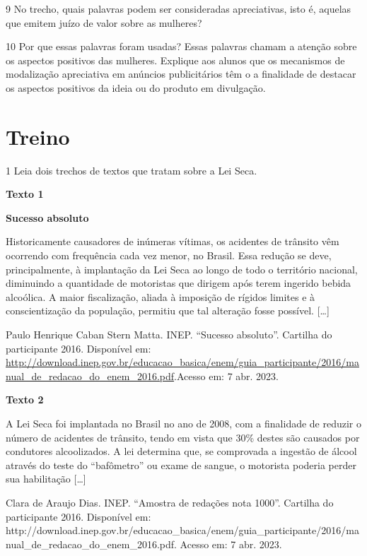 \begin{itemize}
\begin{itemize}
\num{9} No trecho, quais palavras podem ser consideradas apreciativas,
isto é, aquelas que emitem juízo de valor sobre as mulheres? 

\num{10} Por que essas palavras foram usadas?  Essas palavras
chamam a atenção sobre os aspectos positivos das mulheres. Explique aos
alunos que os mecanismos de modalização apreciativa em anúncios
publicitários têm o a finalidade de destacar os aspectos positivos da
ideia ou do produto em divulgação.

\section{Treino}

\num{1} Leia dois trechos de textos que tratam sobre a Lei Seca.

\textbf{Texto 1}

\textbf{Sucesso absoluto}

Historicamente causadores de inúmeras vítimas, os acidentes de trânsito
vêm ocorrendo com frequência cada vez menor, no Brasil. Essa redução se
deve, principalmente, à implantação da Lei Seca ao longo de todo o
território nacional, diminuindo a quantidade de motoristas que dirigem
após terem ingerido bebida alcoólica. A maior fiscalização, aliada à
imposição de rígidos limites e à conscientização da população, permitiu
que tal alteração fosse possível. {[}\ldots{}{]}

Paulo Henrique Caban Stern Matta. INEP. ``Sucesso absoluto''. Cartilha
do participante 2016. Disponível em:
\url{http://download.inep.gov.br/educacao_basica/enem/guia_participante/2016/manual_de_redacao_do_enem_2016.pdf}.Acesso
em: 7 abr. 2023.

\textbf{Texto 2}

A Lei Seca foi implantada no Brasil no ano de 2008, com a finalidade de
reduzir o número de acidentes de trânsito, tendo em vista que 30\%
destes são causados por condutores alcoolizados. A lei determina que, se
comprovada a ingestão de álcool através do teste do ``bafômetro'' ou
exame de sangue, o motorista poderia perder sua habilitação
{[}\ldots{}{]}

Clara de Araujo Dias. INEP. ``Amostra de redações nota 1000''. Cartilha
do participante 2016. Disponível em:
http://download.inep.gov.br/educacao\_basica/enem/guia\_participante/2016/manual\_de\_redacao\_do\_enem\_2016.pdf.
Acesso em: 7 abr. 2023.


\end{itemize}
\end{itemize}
